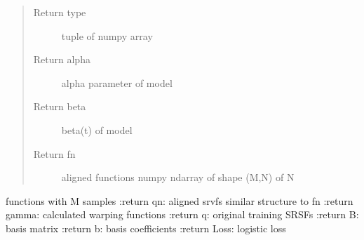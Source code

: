 \documentclass[letterpaper,10pt,english]{sphinxmanual}
\begin{document}
\begin{fulllineitems}
\begin{quote}
\begin{description}
\begin{itemize}
\end{itemize}

\item[{Return type}] \leavevmode
tuple of numpy array

\item[{Return alpha}] \leavevmode
alpha parameter of model

\item[{Return beta}] \leavevmode
beta(t) of model

\item[{Return fn}] \leavevmode
aligned functions \sphinxhyphen{} numpy ndarray of shape (M,N) of N

\end{description}\end{quote}

functions with M samples
:return qn: aligned srvfs \sphinxhyphen{} similar structure to fn
:return gamma: calculated warping functions
:return q: original training SRSFs
:return B: basis matrix
:return b: basis coefficients
:return Loss: logistic loss

\end{fulllineitems}

\end{document}
